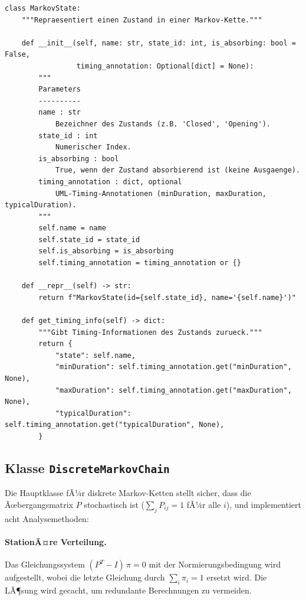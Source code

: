 ﻿\documentclass[a4paper,12pt]{report}
\theoremstyle{definition}
\begin{document}
\begin{lstlisting}[style=python, caption={MarkovState: Zustand mit MARTE-konformen Timing-Annotationen}, label=lst:markovstate]
class MarkovState:
    """Repraesentiert einen Zustand in einer Markov-Kette."""

    def __init__(self, name: str, state_id: int, is_absorbing: bool = False,
                 timing_annotation: Optional[dict] = None):
        """
        Parameters
        ----------
        name : str
            Bezeichner des Zustands (z.B. 'Closed', 'Opening').
        state_id : int
            Numerischer Index.
        is_absorbing : bool
            True, wenn der Zustand absorbierend ist (keine Ausgaenge).
        timing_annotation : dict, optional
            UML-Timing-Annotationen (minDuration, maxDuration, typicalDuration).
        """
        self.name = name
        self.state_id = state_id
        self.is_absorbing = is_absorbing
        self.timing_annotation = timing_annotation or {}

    def __repr__(self) -> str:
        return f"MarkovState(id={self.state_id}, name='{self.name}')"

    def get_timing_info(self) -> dict:
        """Gibt Timing-Informationen des Zustands zurueck."""
        return {
            "state": self.name,
            "minDuration": self.timing_annotation.get("minDuration", None),
            "maxDuration": self.timing_annotation.get("maxDuration", None),
            "typicalDuration": self.timing_annotation.get("typicalDuration", None),
        }
\end{lstlisting}

\subsection{Klasse \texttt{DiscreteMarkovChain}}

Die Hauptklasse fÃ¼r diskrete Markov-Ketten stellt sicher, dass die
Ãœbergangsmatrix $P$ stochastisch ist ($\sum_j P_{ij} = 1$ fÃ¼r alle $i$),
und implementiert acht Analysemethoden:

\paragraph{StationÃ¤re Verteilung.}
Das Gleichungssystem $(P^T - I)\,\pi = 0$ mit der Normierungsbedingung
wird aufgestellt, wobei die letzte Gleichung durch $\sum_i \pi_i = 1$
ersetzt wird. Die LÃ¶sung wird gecacht, um redundante Berechnungen zu vermeiden.
\end{document}
